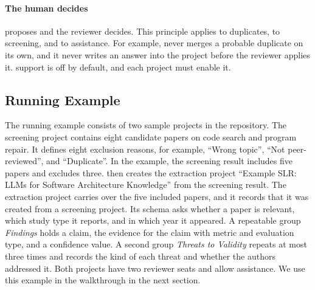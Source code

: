 \paragraph{The human decides}
\SaiLoR proposes and the reviewer decides.
This principle applies to duplicates, to screening, and to \LLM assistance.
For example, \SaiLoR never merges a probable duplicate on its own, and it never writes an \LLM answer into the project before the reviewer applies it.
\LLM support is off by default, and each project must enable it.

\subsection{Running Example}\label{sec:approach-example}

The running example consists of two sample projects in the repository.
The screening project contains eight candidate papers on code search and program repair.
It defines eight exclusion reasons, for example, \enquote{Wrong topic}, \enquote{Not peer-reviewed}, and \enquote{Duplicate}.
In the example, the screening result includes five papers and excludes three.
\SaiLoR then creates the extraction project \enquote{Example SLR: LLMs for Software Architecture Knowledge} from the screening result.
The extraction project carries over the five included papers, and it records that it was created from a screening project.
Its schema asks whether a paper is relevant, which study type it reports, and in which year it appeared.
A repeatable group \emph{Findings} holds a claim, the evidence for the claim with metric and evaluation type, and a confidence value.
A second group \emph{Threats to Validity} repeats at most three times and records the kind of each threat and whether the authors addressed it.
Both projects have two reviewer seats and allow \LLM assistance.
We use this example in the walkthrough in the next section.
